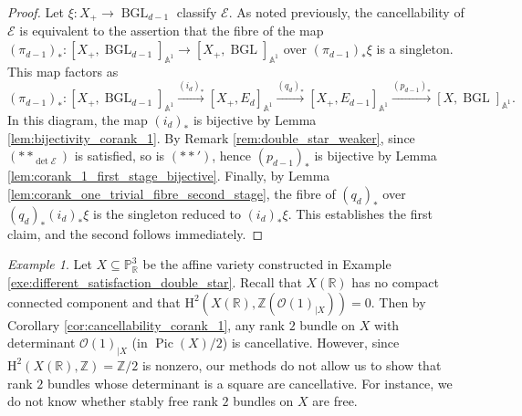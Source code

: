 \documentclass[11pt,leqno]{amsart}
\newcommand{\Osc}{{\mathscr{O}}}
\newcommand{\Esc}{{\mathscr{E}}}
\renewcommand{\1}{{\rm 1\hspace*{-0.4ex}%
\rule{0.1ex}{1.52ex}\hspace*{0.2ex}}}
\newcommand{\Pic}{\operatorname{Pic}}
\newcommand{\Hr}{{\mathrm {H}}}
\newcommand{\<}[1]{{\langle}#1 {\rangle}}
\newcommand{\Rb}{\mathbb{R}}
\newcommand{\Zb}{\mathbb{Z}}
\newcommand{\Abb}{\mathbb{A}}
\newcommand{\BGL}{\operatorname{BGL}}
\theoremstyle{plain}
\theoremstyle{definition}
\theoremstyle{remark}
\newtheorem{ex}[thm]{Example}
\numberwithin{equation}{section}
\begin{document}
\begin{proof}
Let $\xi:X_+\to\BGL_{d-1}$ classify $\Esc$. As noted previously, the cancellability of $\Esc$ is equivalent to the assertion that the fibre of the map $(\pi_{d-1})_*:[X_+,\BGL_{d-1}]_{\Abb^1}\to[X_+,\BGL]_{\Abb^1}$ over $(\pi_{d-1})_*\xi$ is a singleton. This map factors as \[(\pi_{d-1})_*:[X_+,\BGL_{d-1}]_{\Abb^1}\xrightarrow{(i_d)_*}[X_+,E_d]_{\Abb^1}\xrightarrow{(q_d)_*}[X_+,E_{d-1}]_{\Abb^1}\xrightarrow{(p_{d-1})_*}[X,\BGL]_{\Abb^1}.\] In this diagram, the map $(i_d)_*$ is bijective by Lemma \ref{lem:bijectivity_corank_1}. By Remark \ref{rem:double_star_weaker}, since $(**_{\det\Esc})$ is satisfied, so is $(**')$, hence $(p_{d-1})_*$ is bijective by Lemma \ref{lem:corank_1_first_stage_bijective}. Finally, by Lemma \ref{lem:corank_one_trivial_fibre_second_stage}, the fibre of $(q_d)_*$ over $(q_d)_*(i_d)_*\xi$ is the singleton reduced to $(i_d)_*\xi$. This establishes the first claim, and the second follows immediately.
\end{proof}

\begin{ex}\label{ex:partial_cancellability_corank_1}
Let $X\subseteq\mathbb{P}_\Rb^3$ be the affine variety constructed in Example \ref{exe:different_satisfaction_double_star}. Recall that $X(\Rb)$ has no compact connected component and that $\Hr^2(X(\Rb),\Zb(\Osc(1)_{|X}))=0$. Then by Corollary \ref{cor:cancellability_corank_1}, any rank $2$ bundle on $X$ with determinant $\Osc(1)_{|X}$ (in $\Pic(X)/2$) is cancellative. However, since $\Hr^2(X(\Rb),\Zb)=\Zb/2$ is nonzero, our methods do not allow us to show that rank $2$ bundles whose determinant is a square are cancellative. For instance, we do not know whether stably free rank $2$ bundles on $X$ are free.
\end{ex}
\end{document}
